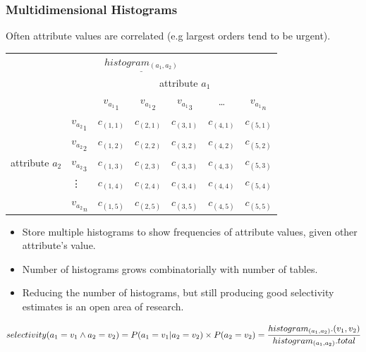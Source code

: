 \subsubsection{Multidimensional Histograms}
Often attribute values are correlated (e.g largest orders tend to be urgent).
\begin{center}
    \begin{tabular}{l l c c c c c}
        \multicolumn{7}{c}{$\underline{histogram_{(a_1, a_2)}}$}                                                                                             \\
                                         &               & \multicolumn{5}{c}{attribute $a_1$}                                                               \\
                                         &               & ${v_{a_1}}_1$                       & ${v_{a_1}}_2$ & ${v_{a_1}}_3$ & \dots       & ${v_{a_1}}_n$ \\
        \multirow{5}{*}{attribute $a_2$} & ${v_{a_2}}_1$ & $c_{(1,1)}$                         & $c_{(2,1)}$   & $c_{(3,1)}$   & $c_{(4,1)}$ & $c_{(5,1)}$   \\
                                         & ${v_{a_2}}_2$ & $c_{(1,2)}$                         & $c_{(2,2)}$   & $c_{(3,2)}$   & $c_{(4,2)}$ & $c_{(5,2)}$   \\
                                         & ${v_{a_2}}_3$ & $c_{(1,3)}$                         & $c_{(2,3)}$   & $c_{(3,3)}$   & $c_{(4,3)}$ & $c_{(5,3)}$   \\
                                         & \vdots        & $c_{(1,4)}$                         & $c_{(2,4)}$   & $c_{(3,4)}$   & $c_{(4,4)}$ & $c_{(5,4)}$   \\
                                         & ${v_{a_2}}_n$ & $c_{(1,5)}$                         & $c_{(2,5)}$   & $c_{(3,5)}$   & $c_{(4,5)}$ & $c_{(5,5)}$   \\
    \end{tabular}
\end{center}

\begin{itemize}
    \item Store multiple histograms to show frequencies of attribute values, given other attribute's value.
    \item Number of histograms grows combinatorially with number of tables.
    \item Reducing the number of histograms, but still producing good selectivity estimates is an open area of research.
\end{itemize}
\[selectivity(a_1 = v_1 \land a_2 = v_2) = P(a_1 = v_1 | a_2 = v_2) \times P(a_2 = v_2) = \cfrac{histogram_{(a_1, a_2)}.(v_1, v_2)}{histogram_{(a_1, a_2)}.total} \]

